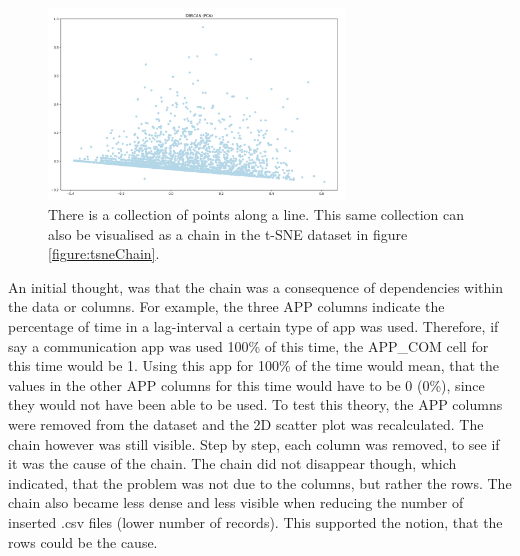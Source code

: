 \begin{figure}[h]
  \centering
  \includegraphics[width=0.7\textwidth]{./images/pcaChain.png}
  \caption{There is a collection of points along a line. This same collection can also be visualised as a chain in the t-SNE dataset in figure \ref{figure:tsneChain}.}
  \label{figure:pcaChain}
\end{figure}

An initial thought, was that the chain was a consequence of dependencies within the data or columns. For example, the three APP columns indicate the percentage of time in a lag-interval a certain type of app was used. Therefore, if say a communication app was used 100\% of this time, the APP\_COM cell for this time would be 1. Using this app for 100\% of the time would mean, that the values in the other APP columns for this time would have to be 0 (0\%), since they would not have been able to be used. To test this theory, the APP columns were removed from the dataset and the 2D scatter plot was recalculated. The chain however was still visible. Step by step, each column was removed, to see if it was the cause of the chain. The chain did not disappear though, which indicated, that the problem was not due to the columns, but rather the rows.  The chain also became less dense and less visible when reducing the number of inserted .csv files (lower number of records). This supported the notion, that the rows could be the cause.


